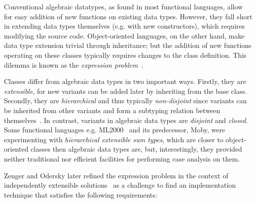 

Conventional algebraic datatypes, as found in most functional languages, allow 
for easy addition of new functions on existing data types. However, they fall short 
in extending data types themselves (e.g. with new constructors), which requires 
modifying the source code. Object-oriented languages, on the other hand, make 
data type extension trivial through inheritance; but the addition of new 
functions operating on these classes typically requires changes to the class 
definition. This dilemma is known as the \emph{expression problem}~\cite{Cook90,exprproblem}.

Classes differ from algebraic data types in two important ways. Firstly, they
are \emph{extensible}, for new variants can be added later by inheriting from
the base class. Secondly, they are \emph{hierarchical} and thus typically 
\emph{non-disjoint} since variants can be inherited from other variants and form 
a subtyping relation between themselves~\cite{Glew99}. In contrast, variants in 
algebraic data types are \emph{disjoint} and \emph{closed}.
Some functional languages e.g. ML2000~\cite{ML2000} and its predecessor, Moby, 
were experimenting with \emph{hierarchical extensible sum types}, which are 
closer to object-oriented classes then algebraic data types are, but, 
interestingly, they provided neither traditional nor efficient facilities for 
performing case analysis on them.

Zenger and Odersky later refined the expression problem in the context of 
independently extensible solutions~\cite{fool12} as a challenge to find an 
implementation technique that satisfies the following requirements:


